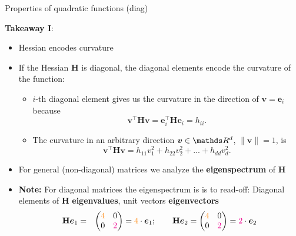   \begin{frame}{Properties of quadratic functions (diag)}
  
  \textbf{Takeaway I}: 
  
  \begin{itemize}
    \item Hessian encodes curvature 
    \item If the Hessian $\mathbf{H}$ is diagonal, the diagonal elements encode the curvature of the function: 
  
    \begin{itemize}
      \item $i$-th diagonal element gives us the curvature in the direction of $\bm{v} = \bm{e}_i$ because 
      $$
      \bm{v}^\top \bm{H} \bm{v} = \bm{e}_i^\top \bm{H} \bm{e}_i = h_{ii}.
      $$
      \item The curvature in an arbitrary direction $\bm{v}
      \in \R^d$, $\|\bm{v}\| = 1$, is 
      $$
      \bm{v}^\top\mathbf{H}\bm{v} = h_{11} v_1^2 + h_{22}v_2^2 + ... + h_{dd}v_d^2. 
      $$
    \end{itemize}
  
    \item<2-> For general (non-diagonal) matrices we analyze the \textbf{eigenspectrum} of $\mathbf{H}$ 
    \vspace*{0.2cm}
    \item<2->[] \begin{footnotesize}
    \textbf{Note: } For diagonal matrices the eigenspectrum is is to read-off: Diagonal elements of $\mathbf{H}$ \textbf{eigenvalues}, unit vectors \textbf{eigenvectors}
    \begin{eqnarray*}
      \mathbf{H} \bm{e}_1 &=& \begin{pmatrix} \textcolor{orange}{4} & 0 \\ 0 & \textcolor{magenta}{2} \end{pmatrix} = \textcolor{orange}{4} \cdot \bm{e}_1; \qquad \mathbf{H} \bm{e}_2 = \begin{pmatrix} \textcolor{orange}{4} & 0 \\ 0 & \textcolor{magenta}{2} \end{pmatrix} = \textcolor{magenta}{2} \cdot \bm{e}_2 \\		
    \end{eqnarray*}	
    \end{footnotesize}
  
  \end{itemize}
  
  
  \end{frame}
  
